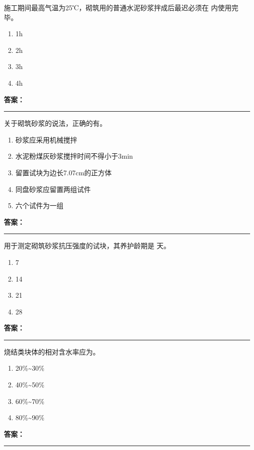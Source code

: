 \documentclass[UTF8,fontset=fandol,11pt]{ctexart}
\newcommand{\answerline}{\textcolor{answerred}{\rule{2.4cm}{0.7pt}}}
\begin{document}
\begin{quizbox}[title={第 8 题}]
施工期间最高气温为25℃，砌筑用的普通水泥砂浆拌成后最迟必须在 内使用完毕。\\
\begin{enumerate}[label=\Alph*.]
\item 1h
\item 2h
\item 3h
\item 4h
\end{enumerate}
\textbf{\textcolor{answerred}{答案：}} \answerline
\end{quizbox}

\begin{quizbox}[title={第 9 题}]
关于砌筑砂浆的说法，正确的有。\\
\begin{enumerate}[label=\Alph*.]
\item 砂浆应采用机械搅拌
\item 水泥粉煤灰砂浆搅拌时间不得小于3min
\item 留置试块为边长7.07cm的正方体
\item 同盘砂浆应留置两组试件
\item 六个试件为一组
\end{enumerate}
\textbf{\textcolor{answerred}{答案：}} \answerline
\end{quizbox}

\begin{quizbox}[title={第 10 题}]
用于测定砌筑砂浆抗压强度的试块，其养护龄期是 天。\\
\begin{enumerate}[label=\Alph*.]
\item 7
\item 14
\item 21
\item 28
\end{enumerate}
\textbf{\textcolor{answerred}{答案：}} \answerline
\end{quizbox}

\begin{quizbox}[title={第 11 题}]
烧结类块体的相对含水率应为。\\
\begin{enumerate}[label=\Alph*.]
\item 20\%\textasciitilde{}30\%
\item 40\%\textasciitilde{}50\%
\item 60\%\textasciitilde{}70\%
\item 80\%\textasciitilde{}90\%
\end{enumerate}
\textbf{\textcolor{answerred}{答案：}} \answerline
\end{quizbox}
\end{document}
